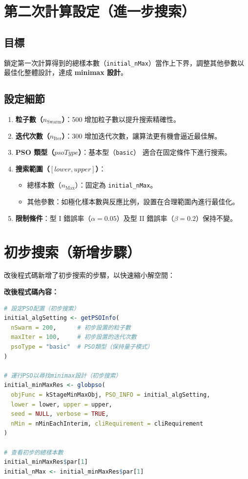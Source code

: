 \section{第二次計算設定（進一步搜索）}

\subsection{目標}
鎖定第一次計算得到的總樣本數（\texttt{initial\_nMax}）當作上下界，調整其他參數以最佳化整體設計，達成 \textbf{minimax 設計}。

\subsection{設定細節}
\begin{enumerate}[1.]
    \item \textbf{粒子數（$n_{\text{Swarm}}$）}：500  
          增加粒子數以提升搜索精確性。
    \item \textbf{迭代次數（$n_{\text{Iter}}$）}：300  
          增加迭代次數，讓算法更有機會逼近最佳解。
    \item \textbf{PSO 類型（$psoType$）}：基本型（\texttt{basic}）  
          適合在固定條件下進行搜索。
    \item \textbf{搜索範圍（$[lower, upper]$）}：
          \begin{itemize}
              \item 總樣本數（$n_{\text{Max}}$）：固定為 \texttt{initial\_nMax}。
              \item 其他參數：如極化樣本數與反應比例，設置在合理範圍內進行最佳化。
          \end{itemize}
    \item \textbf{限制條件}：型 I 錯誤率（$\alpha = 0.05$）及型 II 錯誤率（$\beta = 0.2$）保持不變。
\end{enumerate}


\newpage
\section{初步搜索（新增步驟）}
改後程式碼新增了初步搜索的步驟，以快速縮小解空間：


\textbf{改後程式碼內容：}
\begin{lstlisting}[language=R]
# 設定PSO配置（初步搜索）
initial_algSetting <- getPSOInfo(
  nSwarm = 200,      # 初步設置的粒子數
  maxIter = 100,     # 初步設置的迭代次數
  psoType = "basic"  # PSO類型（保持量子模式）
)

# 運行PSO以尋找minimax設計（初步搜索）
initial_minMaxRes <- globpso(
  objFunc = kStageMinMaxObj, PSO_INFO = initial_algSetting, 
  lower = lower, upper = upper, 
  seed = NULL, verbose = TRUE,
  nMin = nMinEachInterim, cliRequirement = cliRequirement
)

# 查看初步的總樣本數
initial_minMaxRes$par[1]
initial_nMax <- initial_minMaxRes$par[1]
\end{lstlisting}

